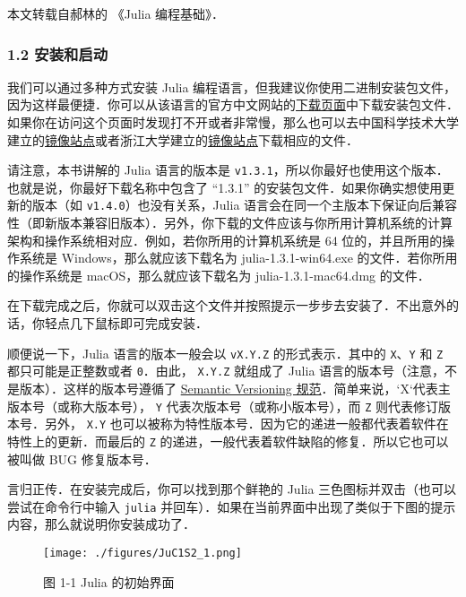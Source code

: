 
本文转载自郝林的 《Julia 编程基础》．

\subsubsection{1.2 安装和启动}

我们可以通过多种方式安装 Julia 编程语言，但我建议你使用二进制安装包文件，因为这样最便捷．你可以从该语言的官方中文网站的\href{https://cn.julialang.org/downloads/}{下载页面}中下载安装包文件．如果你在访问这个页面时发现打不开或者非常慢，那么也可以去中国科学技术大学建立的\href{https://mirrors.zju.edu.cn/julia/releases/}{镜像站点}或者浙江大学建立的\href{https://mirrors.ustc.edu.cn/julia/releases/}{镜像站点}下载相应的文件．

请注意，本书讲解的 Julia 语言的版本是 \verb|v1.3.1|，所以你最好也使用这个版本．也就是说，你最好下载名称中包含了 “1.3.1” 的安装包文件．如果你确实想使用更新的版本（如 \verb|v1.4.0|）也没有关系，Julia 语言会在同一个主版本下保证向后兼容性（即新版本兼容旧版本）．另外，你下载的文件应该与你所用计算机系统的计算架构和操作系统相对应．例如，若你所用的计算机系统是 64 位的，并且所用的操作系统是 Windows，那么就应该下载名为 julia-1.3.1-win64.exe 的文件．若你所用的操作系统是 macOS，那么就应该下载名为 julia-1.3.1-mac64.dmg 的文件．

在下载完成之后，你就可以双击这个文件并按照提示一步步去安装了．不出意外的话，你轻点几下鼠标即可完成安装．

顺便说一下，Julia 语言的版本一般会以 \verb|vX.Y.Z| 的形式表示．其中的 \verb|X|、\verb|Y| 和 \verb|Z| 都只可能是正整数或者 \verb|0|．由此， \verb|X.Y.Z| 就组成了 Julia 语言的版本号（注意，不是版本）．这样的版本号遵循了 \href{https://semver.org}{Semantic Versioning 规范}．简单来说，`X`代表主版本号（或称大版本号）， \verb|Y| 代表次版本号（或称小版本号），而 \verb|Z| 则代表修订版本号．另外， \verb|X.Y| 也可以被称为特性版本号．因为它的递进一般都代表着软件在特性上的更新．而最后的 \verb|Z| 的递进，一般代表着软件缺陷的修复．所以它也可以被叫做 BUG 修复版本号．

言归正传．在安装完成后，你可以找到那个鲜艳的 Julia 三色图标并双击（也可以尝试在命令行中输入 \verb|julia| 并回车）．如果在当前界面中出现了类似于下图的提示内容，那么就说明你安装成功了．

\begin{figure}[ht]
\centering
\texttt{[image: ./figures/JuC1S2\_1.png]}
\caption{图 1-1 Julia 的初始界面} \label{JuC1S2_fig1}
\end{figure}

